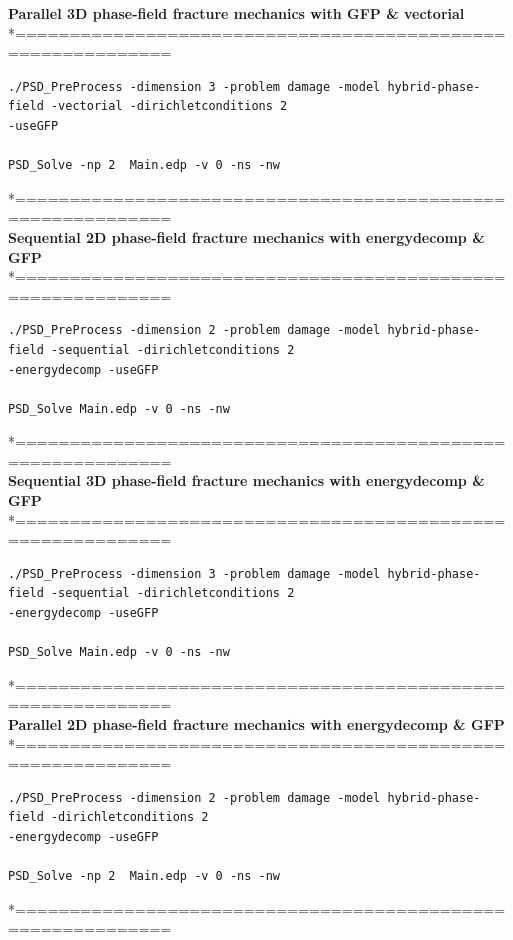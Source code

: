 \documentclass{report}
\begin{document}
\textbf{ Parallel 3D phase-field fracture mechanics with GFP \& vectorial }\\
*============================================================\\
\begin{lstlisting}[style=Linux]
./PSD_PreProcess -dimension 3 -problem damage -model hybrid-phase-field -vectorial -dirichletconditions 2 
-useGFP   

PSD_Solve -np 2  Main.edp -v 0 -ns -nw   
\end{lstlisting}
*============================================================\\
 \textbf{Sequential 2D phase-field fracture mechanics with energydecomp \& GFP} \\
*============================================================\\
\begin{lstlisting}[style=Linux]
./PSD_PreProcess -dimension 2 -problem damage -model hybrid-phase-field -sequential -dirichletconditions 2 
-energydecomp -useGFP   

PSD_Solve Main.edp -v 0 -ns -nw   
\end{lstlisting}
*============================================================\\
\textbf{ Sequential 3D phase-field fracture mechanics with energydecomp \& GFP} \\
*============================================================\\
\begin{lstlisting}[style=Linux]
./PSD_PreProcess -dimension 3 -problem damage -model hybrid-phase-field -sequential -dirichletconditions 2 
-energydecomp -useGFP   

PSD_Solve Main.edp -v 0 -ns -nw   
\end{lstlisting}
*============================================================\\
 \textbf{Parallel 2D phase-field fracture mechanics with energydecomp \& GFP} \\
*============================================================\\
\begin{lstlisting}[style=Linux]
./PSD_PreProcess -dimension 2 -problem damage -model hybrid-phase-field -dirichletconditions 2 
-energydecomp -useGFP  

PSD_Solve -np 2  Main.edp -v 0 -ns -nw   
\end{lstlisting}
*============================================================\\
\end{document}

